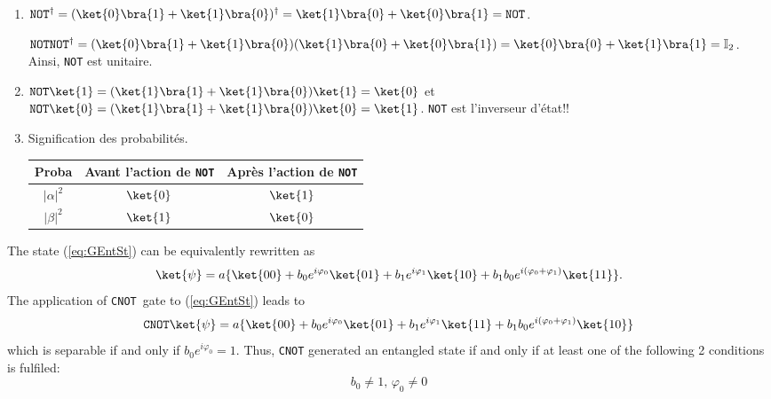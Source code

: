 \begin{solution}
\begin{enumerate}
\begin{enumerate}
\item $\mathtt{NOT}^{\dag}=(\ket{0}\bra{1}+\ket{1}\bra{0})^{\dag}=\ket{1}
\bra{0}+\ket{0}\bra{1} =\mathtt{NOT}$.

$\mathtt{NOT}\mathtt{NOT}^{\dag}=(\ket{0}\bra{1}+\ket{1}\bra{0})(\ket{1}\bra{0}
+\ket{0}\bra{1})=\ket{0}\bra{0}+\ket{1}\bra{1} =\mathbb{I}_2$. Ainsi,
\texttt{NOT} est unitaire.

\item $\mathtt{NOT}\ket{1} =(\ket{1}\bra{1} +\ket{1}\bra{0})\ket{1}=\ket{0}$ et
$\mathtt{NOT}\ket{0} =(\ket{1}\bra{1} +\ket{1}\bra{0})\ket{0}=\ket{1}$.
\texttt{NOT} est l'inverseur d'état!!

\item Signification des probabilités.
\begin{center}
\begin{tabular}
[c]{|c|c|c|}\hline
Proba& Avant l'action de \texttt{NOT} & Après l'action de \texttt{NOT}\\\hline
$|\alpha|^{2}$ & $\ket{0} $ & $\ket{1} $\\\hline
$|\beta|^{2}$ & $\ket{1} $ & $\ket{0} $\\\hline
\end{tabular}
\end{center}
\end{enumerate}
\end{enumerate}
\end{solution}

\begin{solution}

The state (\ref{eq:GEntSt}) can be equivalently rewritten as
\begin{equation}
\ket{\psi}=a\{\ket{00}+b_0e^{i\varphi_0}\ket{01}+b_1e^{i\varphi_1}
\ket{10}+b_1b_0e^{i(\varphi_0+\varphi_1)}\ket{11}\}.
\label{eq:GEntSt2}
\end{equation}
The application of \texttt{CNOT}\ gate to (\ref{eq:GEntSt}) leads to
\begin{equation}
\mathtt{CNOT}\ket{\psi}=a\{\ket{00}+b_0e^{i\varphi_0}\ket{01}+b_1
e^{i\varphi_1}\ket{11}+b_1b_0e^{i(\varphi_0+\varphi_1)}\ket{10}\}
\end{equation}
which is separable if and only if $b_0e^{i\varphi_0}=1$. Thus, \texttt{CNOT}
generated an entangled state if and only if at least one of the following 2
conditions is fulfiled:%
\begin{equation}
b_0\neq1,\,\varphi_0\neq0
\end{equation}
\end{solution}


